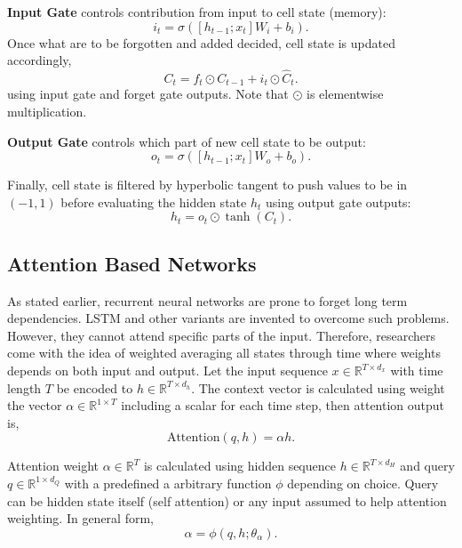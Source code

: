\textbf{Input Gate} controls contribution from input to cell state (memory): 
\begin{equation}
\label{eqn:lstm_inp}
i_t = \sigma( [h_{t-1}; x_t] W_i + b_{i}).
\end{equation}
Once what are to be forgotten and added decided, cell state is updated accordingly, 
\begin{equation}
\label{eqn:lstm_cellstupt}
C_t = f_t \odot C_{t-1} + i_t \odot \hat{C}_t.
\end{equation}
using input gate and forget gate outputs. Note that $\odot$ is elementwise multiplication.

\textbf{Output Gate} controls which part of new cell state to be output: 
\begin{equation}
\label{eqn:lstm_out}
o_t = \sigma( [h_{t-1}; x_t] W_o + b_o).
\end{equation}

Finally, cell state is filtered by hyperbolic tangent to push values to be in $(-1,1)$ before evaluating the hidden state $h_t$ using output gate outputs: 
\begin{equation}
h_t = o_t \odot \tanh(C_t).
\end{equation}

\subsection{Attention Based Networks}

As stated earlier, recurrent neural networks are prone to forget long term dependencies. 
LSTM and other variants are invented to overcome such problems. 
However, they cannot attend specific parts of the input. 
Therefore, researchers come with the idea of weighted averaging all states through time where weights depends on both input and output. 
Let the input sequence $x \in \mathbb{R}^{T \times d_x}$ with time length $T$ be encoded to $h \in \mathbb{R}^{T \times d_h}$. 
The context vector is calculated using weight the vector $\alpha \in \mathbb{R}^{1 \times T}$ including a scalar for each time step, then attention output is, 
\begin{equation}
\mathrm{Attention}(q, h) = \alpha h. %
\label{eq:attention_generic}
\end{equation}  

Attention weight $\alpha \in \mathbb{R}^{T}$ is calculated using hidden sequence
$h \in \mathbb{R}^{T \times d_H}$ and query $q \in \mathbb{R}^{1 \times d_Q}$ with a predefined a arbitrary function $\phi$ depending on choice. 
Query can be hidden state itself (self attention) or any input assumed to help attention weighting. 
In general form,  
\begin{equation}
\alpha = \phi(q, h; \theta_{\alpha}).
\end{equation}

